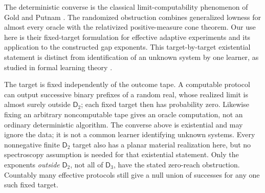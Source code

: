 The deterministic converse is the classical limit-computability
phenomenon of Gold and Putnam \cite{goldLimit,putnamTrial}.
The randomized obstruction combines generalized lowness for almost
every oracle with the relativized positive-measure cone theorem.
Our use here is their fixed-target formulation for effective adaptive
experiments and its application to the constructed gap exponents.
This target-by-target existential statement is distinct from
identification of an unknown system by one learner, as studied in
formal learning theory \cite{kellyLearning}.

The target is fixed independently of the outcome tape. A computable
protocol can output successive binary prefixes of a random real,
whose realized limit is almost surely outside $\mathsf D_2$; each
fixed target then has probability zero. Likewise fixing an arbitrary
noncomputable tape gives an oracle computation, not an ordinary
deterministic algorithm. The converse above is existential and may
ignore the data; it is not a common learner identifying unknown
systems. Every nonnegative finite $\mathsf D_2$ target also has a
planar material realization here, but no spectroscopy assumption is
needed for that existential statement. Only the exponents
\emph{outside} $\mathsf D_2$, not all of $\mathsf D_3$, have the
stated zero-reach obstruction. Countably many effective protocols
still give a null union of successes for any one such fixed target.

